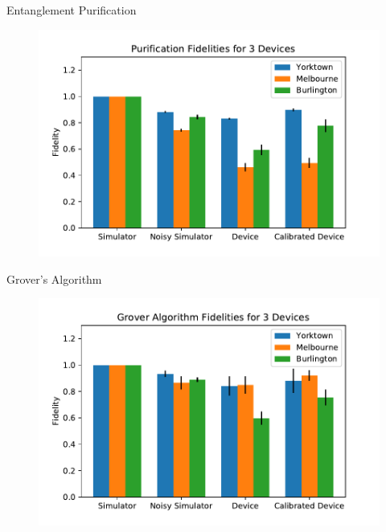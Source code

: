 \begin{frame}{Entanglement Purification}
\begin{figure}
	\includegraphics[width=1\textwidth]{images/results/purification_histogram.pdf}
\end{figure}
\end{frame}

\begin{frame}{Grover's Algorithm}
\begin{figure}
	\includegraphics[width=1\textwidth]{images/results/grover_histogram.pdf}
\end{figure}
\end{frame}

